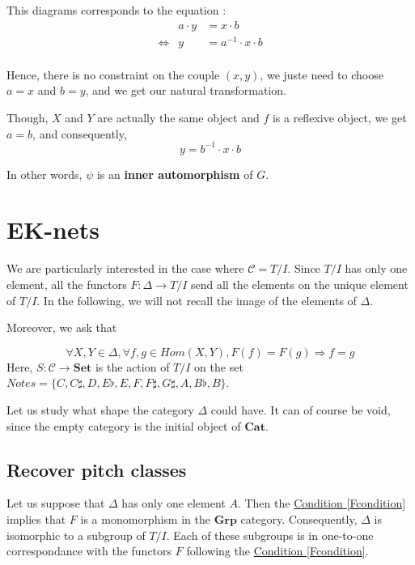 \documentclass{report}
\begin{document}
This diagrams corresponds to the equation :
\begin{eqnarray*}
    &a\cdot y &= x \cdot b\\
    \Leftrightarrow & y &= a^{-1}\cdot x\cdot  b\\
\end{eqnarray*}

Hence, there is no constraint on the couple $(x,y)$, we juste need to choose $a = x$ and $b = y$, and we get our natural transformation.

Though, $X$ and $Y$ are actually the same object and $f$ is a reflexive object, we get $a = b$, and consequently,
$$y = b^{-1}\cdot x \cdot b $$

In other words, $\psi$ is an \textbf{inner automorphism} of $G$.


\chapter{EK-nets}

We are particularly interested in the case where $\mathcal{C} = T/I$. Since $T/I$ has only one element, all the functors $F:\Delta \rightarrow T/I$ send all the elements on the unique element of $T/I$. In the following, we will not recall the image of the elements of $\Delta$.

Moreover, we ask that

\begin{equation}
    \forall X, Y\in \Delta, \forall f, g \in Hom(X,Y), F(f) = F(g) \Rightarrow f = g
    \label{Fcondition}
\end{equation}
Here, $S:\mathcal{C}\rightarrow \textbf{Set}$ is the action of $T/I$ on the set $Notes = \{C,C\sharp,D,E\flat,E,F,F\sharp,G\sharp,A,B\flat,B\}$.

Let us study what shape the category $\Delta$ could have. It can of course be void, since the empty category is the initial object of $\textbf{Cat}$.

\section{Recover pitch classes}
Let us suppose that $\Delta$ has only one element $A$. Then the \hyperref[Fcondition]{Condition \ref*{Fcondition}} implies that $F$ is a monomorphism in the $\textbf{Grp}$ category. Consequently, $\Delta$ is isomorphic to a subgroup of $T/I$. Each of these subgroups is in one-to-one correspondance with the functors $F$ following the \hyperref[Fcondition]{Condition \ref*{Fcondition}}.
\end{document}
